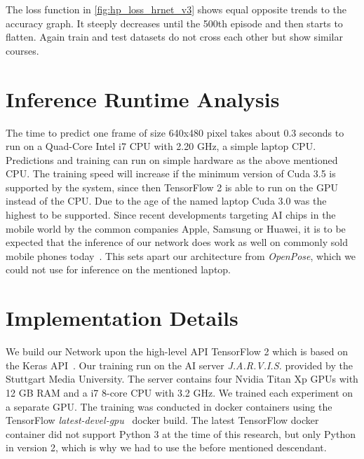 The loss function in \autoref{fig:hp_loss_hrnet_v3} shows equal opposite trends to the accuracy graph.
It steeply decreases until the 500th episode and then starts to flatten.
Again train and test datasets do not cross each other but show similar courses.

\section{Inference Runtime Analysis}
The time to predict one frame of size 640x480 pixel takes about 0.3 seconds to run on a Quad-Core Intel i7 CPU with 2.20 GHz,
a simple laptop CPU.
Predictions and training can run on simple hardware as the above mentioned CPU.
The training speed will increase if the minimum version of Cuda
3.5 is supported by the system, since then TensorFlow 2 is able to run on the GPU instead of the CPU.
Due to the age of the named laptop Cuda 3.0 was the highest to be supported.
Since recent developments targeting AI chips in the mobile world by the common companies Apple, Samsung or Huawei,
it is to be expected that the inference of our network does work as well on commonly sold mobile phones today~\cite{mobileAI}.
This sets apart our architecture from \textit{OpenPose}, which we could not use for inference on the mentioned laptop.

\section{Implementation Details}
We build our Network upon the high-level API TensorFlow 2 which is based on the Keras API~\cite{tensorflow2}.
Our training run on the AI server \textit{J.A.R.V.I.S.} provided by the Stuttgart Media University.
The server contains four Nvidia Titan Xp GPUs with 12 GB RAM and a i7 8-core CPU with 3.2 GHz.
We trained each experiment on a separate GPU. The training was conducted in docker containers using the TensorFlow
\textit{latest-devel-gpu}~\cite{tensorflowdocker} docker build.
The latest TensorFlow docker container did not support Python 3 at the time of this research, but only Python in version
2, which is why we had to use the before mentioned descendant.


